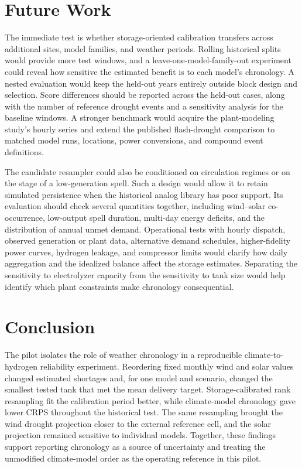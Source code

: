 \documentclass[10pt,a4paper,twocolumn]{article}
\begin{document}



\section{Future Work}
\label{sec:future}
The immediate test is whether storage-oriented calibration transfers across additional sites, model families, and weather periods. Rolling historical splits would provide more test windows, and a leave-one-model-family-out experiment could reveal how sensitive the estimated benefit is to each model's chronology. A nested evaluation would keep the held-out years entirely outside block design and selection. Score differences should be reported across the held-out cases, along with the number of reference drought events and a sensitivity analysis for the baseline windows. A stronger benchmark would acquire the plant-modeling study's hourly series and extend the published flash-drought comparison to matched model runs, locations, power conversions, and compound event definitions.

The candidate resampler could also be conditioned on circulation regimes or on the stage of a low-generation spell. Such a design would allow it to retain simulated persistence when the historical analog library has poor support. Its evaluation should check several quantities together, including wind--solar co-occurrence, low-output spell duration, multi-day energy deficits, and the distribution of annual unmet demand. Operational tests with hourly dispatch, observed generation or plant data, alternative demand schedules, higher-fidelity power curves, hydrogen leakage, and compressor limits would clarify how daily aggregation and the idealized balance affect the storage estimates. Separating the sensitivity to electrolyzer capacity from the sensitivity to tank size would help identify which plant constraints make chronology consequential.

\section{Conclusion}
The pilot isolates the role of weather chronology in a reproducible climate-to-hydrogen reliability experiment. Reordering fixed monthly wind and solar values changed estimated shortages and, for one model and scenario, changed the smallest tested tank that met the mean delivery target. Storage-calibrated rank resampling fit the calibration period better, while climate-model chronology gave lower CRPS throughout the historical test. The same resampling brought the wind drought projection closer to the external reference cell, and the solar projection remained sensitive to individual models. Together, these findings support reporting chronology as a source of uncertainty and treating the unmodified climate-model order as the operating reference in this pilot.
\end{document}
